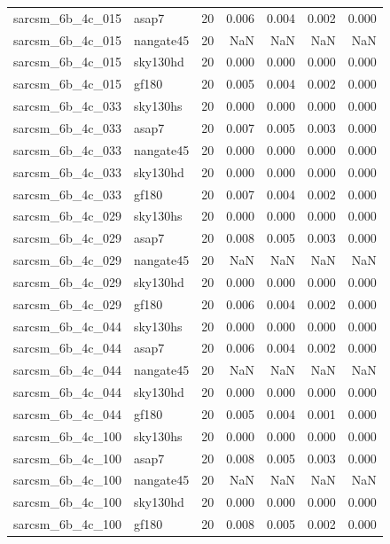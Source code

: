 \begin{tabular}{llrrrrr}
sarcsm\_6b\_4c\_015 & asap7 & 20 & 0.006 & 0.004 & 0.002 & 0.000 \\
sarcsm\_6b\_4c\_015 & nangate45 & 20 & NaN & NaN & NaN & NaN \\
sarcsm\_6b\_4c\_015 & sky130hd & 20 & 0.000 & 0.000 & 0.000 & 0.000 \\
sarcsm\_6b\_4c\_015 & gf180 & 20 & 0.005 & 0.004 & 0.002 & 0.000 \\
sarcsm\_6b\_4c\_033 & sky130hs & 20 & 0.000 & 0.000 & 0.000 & 0.000 \\
sarcsm\_6b\_4c\_033 & asap7 & 20 & 0.007 & 0.005 & 0.003 & 0.000 \\
sarcsm\_6b\_4c\_033 & nangate45 & 20 & 0.000 & 0.000 & 0.000 & 0.000 \\
sarcsm\_6b\_4c\_033 & sky130hd & 20 & 0.000 & 0.000 & 0.000 & 0.000 \\
sarcsm\_6b\_4c\_033 & gf180 & 20 & 0.007 & 0.004 & 0.002 & 0.000 \\
sarcsm\_6b\_4c\_029 & sky130hs & 20 & 0.000 & 0.000 & 0.000 & 0.000 \\
sarcsm\_6b\_4c\_029 & asap7 & 20 & 0.008 & 0.005 & 0.003 & 0.000 \\
sarcsm\_6b\_4c\_029 & nangate45 & 20 & NaN & NaN & NaN & NaN \\
sarcsm\_6b\_4c\_029 & sky130hd & 20 & 0.000 & 0.000 & 0.000 & 0.000 \\
sarcsm\_6b\_4c\_029 & gf180 & 20 & 0.006 & 0.004 & 0.002 & 0.000 \\
sarcsm\_6b\_4c\_044 & sky130hs & 20 & 0.000 & 0.000 & 0.000 & 0.000 \\
sarcsm\_6b\_4c\_044 & asap7 & 20 & 0.006 & 0.004 & 0.002 & 0.000 \\
sarcsm\_6b\_4c\_044 & nangate45 & 20 & NaN & NaN & NaN & NaN \\
sarcsm\_6b\_4c\_044 & sky130hd & 20 & 0.000 & 0.000 & 0.000 & 0.000 \\
sarcsm\_6b\_4c\_044 & gf180 & 20 & 0.005 & 0.004 & 0.001 & 0.000 \\
sarcsm\_6b\_4c\_100 & sky130hs & 20 & 0.000 & 0.000 & 0.000 & 0.000 \\
sarcsm\_6b\_4c\_100 & asap7 & 20 & 0.008 & 0.005 & 0.003 & 0.000 \\
sarcsm\_6b\_4c\_100 & nangate45 & 20 & NaN & NaN & NaN & NaN \\
sarcsm\_6b\_4c\_100 & sky130hd & 20 & 0.000 & 0.000 & 0.000 & 0.000 \\
sarcsm\_6b\_4c\_100 & gf180 & 20 & 0.008 & 0.005 & 0.002 & 0.000 \\

\end{tabular}
